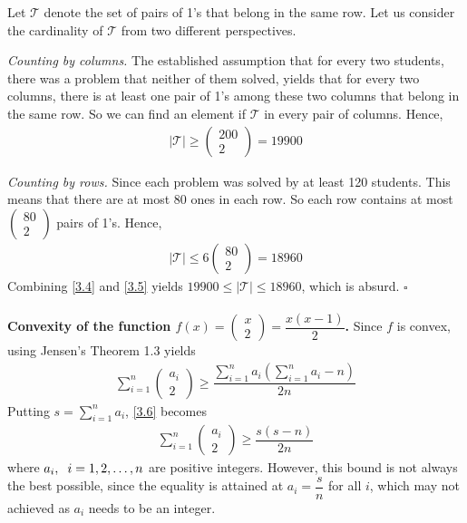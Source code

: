 \documentclass[a4paper,oneside]{article}
\numberwithin{equation}{section}
\begin{document}
Let $\mathcal{T}$ denote the set of pairs of 1's that belong in the same row. Let us consider the cardinality of $\mathcal{T}$ from two different perspectives.

\textit{Counting by columns.} The established assumption that for every two students, there was a problem that neither of them solved, yields that for every two columns, there is at least one pair of 1's among these two columns that belong in the same row. So we can find an element if $\mathcal{T}$ in every pair of columns. Hence,
\begin{align}
\label{3.4}
\left| \mathcal{T} \right| \ge \left( {\begin{array}{*{20}{c}}
{200}\\
2
\end{array}} \right) = 19900
\end{align}

\textit{Counting by rows.} Since each problem was solved by at least 120 students. This means that there are at most 80 ones in each row. So each row contains at most $\left( {\begin{array}{*{20}{c}}
{80}\\
2
\end{array}} \right)$ pairs of 1's. Hence, 
\begin{align}
\label{3.5}
\left| \mathcal{T} \right| \le 6\left( {\begin{array}{*{20}{c}}
{80}\\
2
\end{array}} \right) = 18960
\end{align}
Combining \eqref{3.4} and \eqref{3.5} yields $19900 \le \left| \mathcal{T} \right| \le 18960$, which is absurd. \hfill $\square$\\
\\
\textbf{Convexity of the function $f\left( x \right) = \left( {\begin{array}{*{20}{c}}
x\\
2
\end{array}} \right) = \dfrac{{x\left( {x - 1} \right)}}{2}$.} Since $f$ is convex, using Jensen's Theorem 1.3 yields
\begin{align}
\label{3.6}
\sum\limits_{i = 1}^n {\left( {\begin{array}{*{20}{c}}
{{a_i}}\\
2
\end{array}} \right)}  \ge \dfrac{{\sum\limits_{i = 1}^n {{a_i}} \left( {\sum\limits_{i = 1}^n {{a_i}}  - n} \right)}}{{2n}}
\end{align}
Putting $s = \sum\limits_{i = 1}^n {{a_i}} $, \eqref{3.6} becomes
\begin{align}
\sum\limits_{i = 1}^n {\left( {\begin{array}{*{20}{c}}
{{a_i}}\\
2
\end{array}} \right)}  \ge \dfrac{{s\left( {s - n} \right)}}{{2n}}
\end{align}
where $a_i,\hspace{0.2cm}i=1,2,\ldots,n$ are positive integers. However, this bound is not always the best possible, since the equality is attained at $a_i=\dfrac{s}{n}$ for all $i$, which may not achieved as $a_i$ needs to be an integer.
\end{document}
